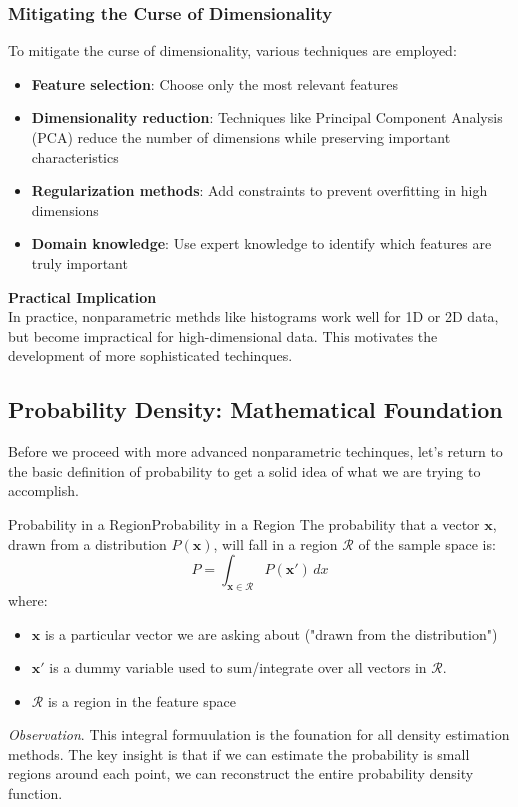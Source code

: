 \documentclass[a4paper]{article}
\theoremstyle{definition}
\begin{document}
\subsubsection{Mitigating the Curse of Dimensionality}
To mitigate the curse of dimensionality, various techniques are employed:
\begin{itemize}
    \item \textbf{Feature selection}: Choose only the most relevant features 
    \item \textbf{Dimensionality reduction}: Techniques like Principal Component Analysis (PCA) reduce the number of dimensions while preserving important characteristics
    \item \textbf{Regularization methods}: Add constraints to prevent overfitting in high dimensions
    \item \textbf{Domain knowledge}: Use expert knowledge to identify which features are truly important
\end{itemize}
\begin{tcolorbox}[
    colback=yellow!15!white,
    colframe=yellow!15!white,
    boxrule=0pt,
    arc=0pt,
    halign=center
]
    \textbf{Practical Implication}\\[0.6em]
    In practice, nonparametric methds like histograms work well for 1D or 2D data, but become impractical for high-dimensional data.
    This motivates the development of more sophisticated techinques.
\end{tcolorbox}
\subsection{Probability Density: Mathematical Foundation}
Before we proceed with more advanced nonparametric techinques, let's return to the basic definition of probability to get a solid idea of what 
we are trying to accomplish.
\begin{definition}{Probability in a Region}{Probability in a Region}
The probability that a vector \( \mathbf{x} \), drawn from a distribution \( P(\mathbf{x}) \), will fall in a region \( \mathcal{R} \) of 
the sample space is:
\[
  P = \int_{\mathbf{x}\in \mathcal{R}}^{} P(\mathbf{x}') \,dx 
\]
where:
\begin{itemize}
    \item \( \mathbf{x} \) is a particular vector we are asking about ("drawn from the distribution")
    \item \( \mathbf{x}' \) is a dummy variable used to sum/integrate over all vectors in \( \mathcal{R} \).
    \item \( \mathcal{R} \) is a region in the feature space
\end{itemize}
\end{definition}
\textit{Observation}. This integral formuulation is the founation for all density estimation methods. The key insight is that if we can estimate 
the probability is small regions around each point, we can reconstruct the entire probability density function.
\end{document}
